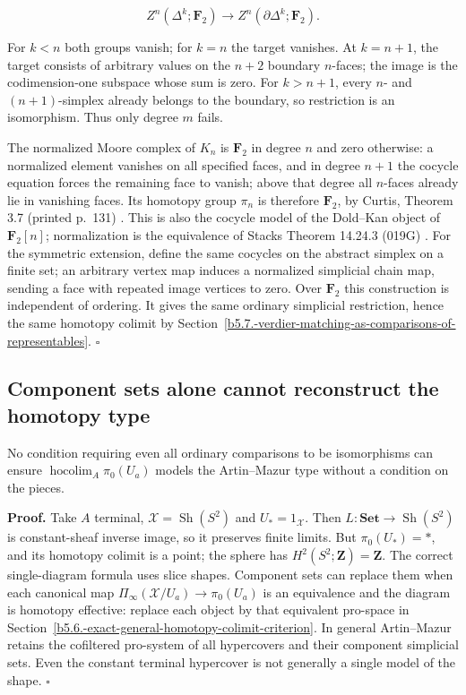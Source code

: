 \documentclass[11pt,a4paper]{article}
\theoremstyle{definition}
\begin{document}
\[Z^n(\Delta^k;\mathbf F_2)\to Z^n(\partial\Delta^k;\mathbf F_2).\]

For \(k<n\) both groups vanish; for \(k=n\) the target vanishes. At
\(k=n+1\), the target consists of arbitrary values on the \(n+2\)
boundary \(n\)-faces; the image is the codimension-one subspace whose
sum is zero. For \(k>n+1\), every \(n\)- and \((n+1)\)-simplex already
belongs to the boundary, so restriction is an isomorphism. Thus only
degree \(m\) fails.

The normalized Moore complex of \(K_n\) is \(\mathbf F_2\) in degree
\(n\) and zero otherwise: a normalized element vanishes on all specified
faces, and in degree \(n+1\) the cocycle equation forces the remaining
face to vanish; above that degree all \(n\)-faces already lie in
vanishing faces. Its homotopy group \(\pi_n\) is therefore
\(\mathbf F_2\), by Curtis, Theorem 3.7 (printed p.~131)
\cite{Curtis}. This is also the cocycle model of the Dold--Kan
object of \(\mathbf F_2[n]\); normalization is the equivalence of Stacks
Theorem 14.24.3 (019G) \cite{StacksDK}. For the symmetric extension,
define the same cocycles on the abstract simplex on a finite set; an
arbitrary vertex map induces a normalized simplicial chain map, sending
a face with repeated image vertices to zero. Over \(\mathbf F_2\) this
construction is independent of ordering. It gives the same ordinary
simplicial restriction, hence the same homotopy colimit by Section~\ref{b5.7.-verdier-matching-as-comparisons-of-representables}. \(\square\)

\subsection{Component sets alone cannot reconstruct the
homotopy
type}\label{b5.9.-component-sets-alone-cannot-reconstruct-the-homotopy-type}

No condition requiring even all ordinary comparisons to be
isomorphisms can ensure \(\operatorname{hocolim}_A\pi_0(U_a)\) models
the Artin--Mazur type without a condition on the pieces.

\textbf{Proof.} Take \(A\) terminal,
\(\mathcal X=\operatorname{Sh}(S^2)\) and \(U_*=1_{\mathcal X}\). Then
\(L:\mathbf{Set}\to\operatorname{Sh}(S^2)\) is constant-sheaf inverse
image, so it preserves finite limits. But \(\pi_0(U_*)=*\), and its
homotopy colimit is a point; the sphere has
\(H^2(S^2;\mathbf Z)=\mathbf Z\). The correct single-diagram formula
uses slice shapes. Component sets can replace them when each canonical
map \(\Pi_\infty(\mathscr X/U_a)\to\pi_0(U_a)\) is an equivalence and
the diagram is homotopy effective: replace each object by that
equivalent pro-space in Section~\ref{b5.6.-exact-general-homotopy-colimit-criterion}. In general Artin--Mazur retains the
cofiltered pro-system of all hypercovers and their component simplicial
sets. Even the constant terminal hypercover is not generally a single
model of the shape. \(\square\)
\end{document}
